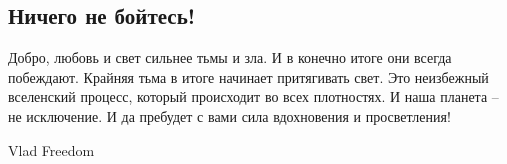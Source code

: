  
 
 
 
 

\subsection{Ничего не бойтесь!}

Добро, любовь и свет сильнее тьмы и зла. И в конечно итоге они всегда
побеждают. Крайняя тьма в итоге начинает притягивать свет. Это неизбежный
вселенский процесс, который происходит во всех плотностях. И наша планета – не
исключение. И да пребудет с вами сила вдохновения и просветления!

Vlad Freedom
